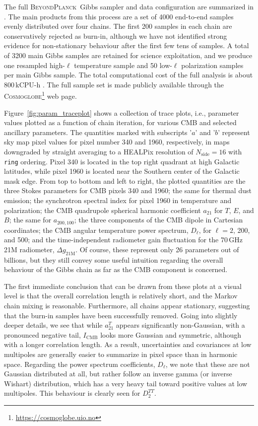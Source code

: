 \documentclass[twocolumn]{aa}
\def\cosmoglobe{\textsc{Cosmoglobe}}
\newcommand{\BP}{\textsc{BeyondPlanck}}
\begin{document}
The full \BP\ Gibbs sampler and data configuration are summarized in
\citet{bp01}. The main products from this process are a set of 4000
end-to-end samples evenly distributed over four chains. The first 200 samples
in each chain are conservatively rejected as burn-in, although we have
not identified strong evidence for non-stationary behaviour after the
first few tens of samples. A total of 3200 main Gibbs samples are
retained for science exploitation, and we produce one resampled
high-$\ell$ temperature sample and 50 low-$\ell$ polarization samples
per main Gibbs sample. The total computational cost of the full
analysis is about 800\,kCPU-h \citep{bp03}. The full sample set is
made publicly available through the
\cosmoglobe\footnote{\url{https://cosmoglobe.uio.no}} web page.

Figure~\ref{fig:param_traceplot} shows a collection of trace plots,
i.e., parameter values plotted as a function of chain iteration, for
various CMB and selected ancillary parameters. The quantities marked
with subscripts '$a$' and '$b$' represent sky map pixel values for 
pixel number 340 and 1960, respectively, in maps downgraded by straight averaging to a HEALPix resolution of $N_{\mathrm{side}}=16$ with \texttt{ring}
ordering. Pixel 340 is located in the top right quadrant at high
Galactic latitudes, while pixel 1960 is located near the Southern
center of the Galactic mask edge. From top to
bottom and left to right, the plotted quantities are the three Stokes parameters for CMB
pixels 340 and 1960; the same for thermal dust emission; the
synchrotron spectral index for pixel 1960 in temperature and
polarization; the CMB quadrupole spherical harmonic coefficient
$a_{21}$ for $T$, $E$, and $B$; the same for $a_{200,100}$; the three
components of the CMB dipole in Cartesian coordinates; the CMB angular
temperature power spectrum, $D_{\ell}$, for $\ell=2$, 200, and 500;
and the time-independent radiometer gain fluctuation for the 70\,GHz
21M radiometer, $\Delta g_{21\mathrm{M}}$. Of course, these represent
only 26 parameters out of billions, but they still convey some useful
intuition regarding the overall behaviour of the Gibbs chain as far as
the CMB component is concerned.

The first immediate conclusion that can be drawn from these plots at a
visual level is that the overall correlation length is relatively
short, and the Markov chain mixing is reasonable. Furthermore, all
chains appear stationary, suggesting that the burn-in samples have
been successfully removed. Going into slightly deeper details, we see
that while $a_{21}^{T}$ appears significantly non-Gaussian, with a
pronounced negative tail, $I_{\mathrm{CMB}}$ looks more Gaussian and
symmetric, although with a longer correlation length. As a result,
uncertainties and covariances at low multipoles are generally easier
to summarize in pixel space than in harmonic space. Regarding the
power spectrum coefficients, $D_{\ell}$, we note that these are not
Gaussian distributed at all, but rather follow an inverse gamma (or
inverse Wishart) distribution, which has a very heavy tail toward
positive values at low multipoles. This behaviour is clearly seen for
$D_{2}^{TT}$. 
\end{document}
